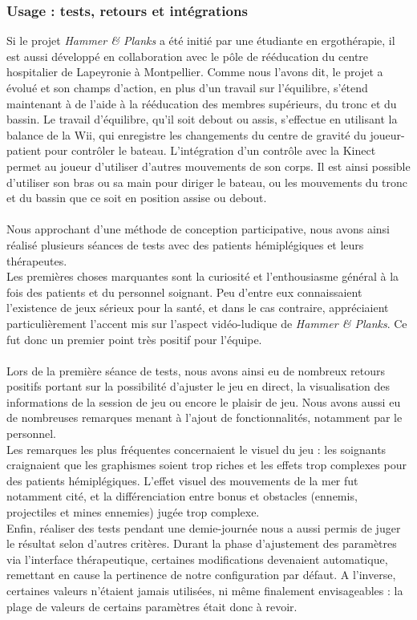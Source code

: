 	\subsubsection*{Usage : tests, retours et intégrations}
Si le projet \emph{Hammer \& Planks} a été initié par une étudiante en ergothérapie, il est aussi développé en collaboration avec le pôle de rééducation du centre hospitalier de Lapeyronie à Montpellier. Comme nous l'avons dit, le projet a évolué et son champs d'action, en plus d'un travail sur l'équilibre, s'étend maintenant à de l'aide à la rééducation des membres supérieurs, du tronc et du bassin. Le travail d'équilibre, qu'il soit debout ou assis, s'effectue en utilisant la balance de la Wii, qui enregistre les changements du centre de gravité du joueur-patient pour contrôler le bateau. L'intégration d'un contrôle avec la Kinect permet au joueur d'utiliser d'autres mouvements de son corps. Il est ainsi possible d'utiliser son bras ou sa main pour diriger le bateau, ou les mouvements du tronc et du bassin que ce soit en position assise ou debout.

\paragraph{} Nous approchant d'une méthode de conception participative, nous avons ainsi réalisé plusieurs séances de tests avec des patients hémiplégiques et leurs thérapeutes. \\
Les premières choses marquantes sont la curiosité et l'enthousiasme général à la fois des patients et du personnel soignant. Peu d'entre eux connaissaient l'existence de jeux sérieux pour la santé, et dans le cas contraire, appréciaient particulièrement l'accent mis sur l'aspect vidéo-ludique de \emph{Hammer \& Planks}. Ce fut donc un premier point très positif pour l'équipe.

\paragraph{} 
Lors de la première séance de tests, nous avons ainsi eu de nombreux retours positifs portant sur la possibilité d'ajuster le jeu en direct, la visualisation des informations de la session de jeu ou encore le plaisir de jeu. Nous avons aussi eu de nombreuses remarques menant à l'ajout de fonctionnalités, notamment par le personnel.\\
Les remarques les plus fréquentes concernaient le visuel du jeu : les soignants craignaient que les graphismes soient trop riches et les effets trop complexes pour des patients hémiplégiques. L'effet visuel des mouvements de la mer fut notamment cité, et la différenciation entre bonus et obstacles (ennemis, projectiles et mines ennemies) jugée trop complexe.\\
Enfin, réaliser des tests pendant une demie-journée nous a aussi permis de juger le résultat selon d'autres critères. Durant la phase d'ajustement des paramètres via l'interface thérapeutique, certaines modifications devenaient automatique, remettant en cause la pertinence de notre configuration par défaut. A l'inverse, certaines valeurs n'étaient jamais utilisées, ni même finalement envisageables : la plage de valeurs de certains paramètres était donc à revoir.

